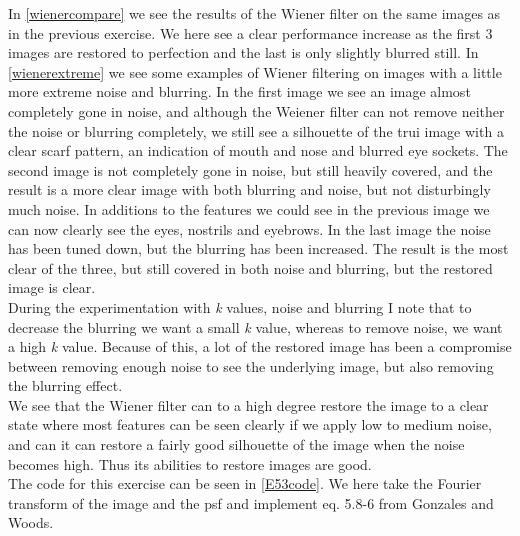 In \autoref{wienercompare} we see the results of the Wiener filter on the same images as in the previous exercise. We here see a clear performance increase as the first 3 images are restored to perfection and the last is only slightly blurred still. In \autoref{wienerextreme} we see some examples of Wiener filtering on images with a little more extreme noise and blurring. In the first image we see an image almost completely gone in noise, and although the Weiener filter can not remove neither the noise or blurring completely, we still see a silhouette of the trui image with a clear scarf pattern, an indication of mouth and nose and blurred eye sockets. The second image is not completely gone in noise, but still heavily covered, and the result is a more clear image with both blurring and noise, but not disturbingly much noise. In additions to the features we could see in the previous image we can now clearly see the eyes, nostrils and eyebrows. In the last image the noise has been tuned down, but the blurring has been increased. The result is the most clear of the three, but still covered in both noise and blurring, but the restored image is clear.\\
During the experimentation with \textit{k} values, noise and blurring I note that to decrease the blurring we want a small \textit{k} value, whereas to remove noise, we want a high \textit{k} value. Because of this, a lot of the restored image has been a compromise between removing enough noise to see the underlying image, but also removing the blurring effect.\\
We see that the Wiener filter can to a high degree restore the image to a clear state where most features can be seen clearly if we apply low to medium noise, and can it can restore a fairly good silhouette of the image when the noise becomes high. Thus its abilities to restore images are good.\\
The code for this exercise can be seen in \autoref{E53code}. We here take the Fourier transform of the image and the psf and implement eq. 5.8-6 from Gonzales and Woods.

